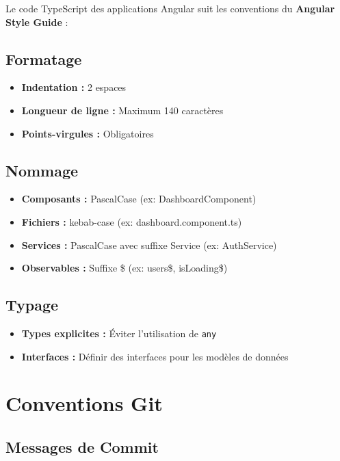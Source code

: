 \documentclass[12pt,a4paper]{report}
\begin{document}
Le code TypeScript des applications Angular suit les conventions du \textbf{Angular Style Guide} :

\subsection{Formatage}

\begin{itemize}
    \item \textbf{Indentation :} 2 espaces
    \item \textbf{Longueur de ligne :} Maximum 140 caractères
    \item \textbf{Points-virgules :} Obligatoires
\end{itemize}

\subsection{Nommage}

\begin{itemize}
    \item \textbf{Composants :} PascalCase (ex: DashboardComponent)
    \item \textbf{Fichiers :} kebab-case (ex: dashboard.component.ts)
    \item \textbf{Services :} PascalCase avec suffixe Service (ex: AuthService)
    \item \textbf{Observables :} Suffixe \$ (ex: users\$, isLoading\$)
\end{itemize}

\subsection{Typage}

\begin{itemize}
    \item \textbf{Types explicites :} Éviter l'utilisation de \texttt{any}
    \item \textbf{Interfaces :} Définir des interfaces pour les modèles de données
\end{itemize}

\section{Conventions Git}

\subsection{Messages de Commit}
\end{document}
